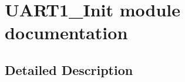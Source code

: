 \hypertarget{group___u_a_r_t1___init__module}{}\section{U\+A\+R\+T1\+\_\+\+Init module documentation}
\label{group___u_a_r_t1___init__module}


\subsection{Detailed Description}

